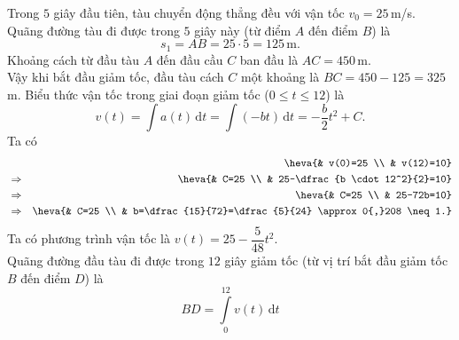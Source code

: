 \begin{ex}
{\begin{center}
		\end{center}
		\begin{itemchoice}
			\itemch 
			Trong $5$ giây đầu tiên, tàu chuyển động thẳng đều với vận tốc $v_0=25$\,m/s.\\ Quãng đường tàu đi được trong $5$ giây này (từ điểm $A$ đến điểm $B$) là \[s_1=AB=25\cdot 5=125\,\mathrm{m}.\]
			Khoảng cách từ đầu tàu $A$ đến đầu cầu $C$ ban đầu là $AC = 450$\,m.\\
			Vậy khi bắt đầu giảm tốc, đầu tàu cách $C$ một khoảng là $BC=450-125=325$\,m.
			\itemch 
			Biểu thức vận tốc trong giai đoạn giảm tốc ($0\le t \le 12$) là
			\[v(t)=\displaystyle\int a(t)\mathrm{\,d}t=\displaystyle\int(-bt) \mathrm{\,d}t=-\dfrac{b}{2}t^2 + C.\]
			Ta có
			\begin{eqnarray*}
				&&\heva{& v(0)=25 \\ & v(12)=10}\\
				&\Rightarrow&\heva{& C=25 \\ & 25-\dfrac{b \cdot 12^2}{2}=10}\\
				&\Rightarrow&\heva{& C=25 \\ & 25-72b=10}\\
				&\Rightarrow&\heva{& C=25 \\ & b=\dfrac{15}{72}=\dfrac{5}{24} \approx 0{,}208 \neq 1.}
			\end{eqnarray*}
			\itemch 
			Ta có phương trình vận tốc là $v(t)=25-\dfrac{5}{48}t^2$.\\
			Quãng đường đầu tàu đi được trong $12$ giây giảm tốc (từ vị trí bắt đầu giảm tốc $B$ đến điểm $D$) là
			\[BD = \displaystyle\int\limits_0^{12} v(t) \mathrm{\,d}t
\]
\end{itemchoice}}
\end{ex}
